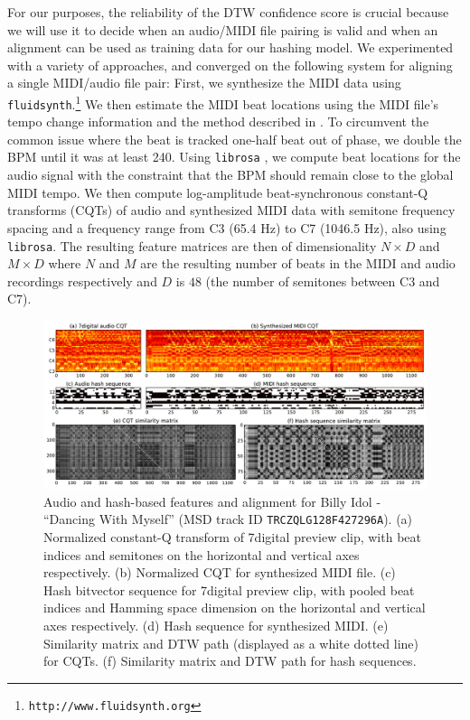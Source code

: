 \documentclass{article}
\begin{document}
For our purposes, the reliability of the DTW confidence score is crucial because we will use it to decide when an audio/MIDI file pairing is valid and when an alignment can be used as training data for our hashing model.
We experimented with a variety of approaches, and converged on the following system for aligning a single MIDI/audio file pair:
First, we synthesize the MIDI data using \texttt{fluidsynth}.\footnote{\texttt{http://www.fluidsynth.org}}
We then estimate the MIDI beat locations using the MIDI file's tempo change information and the method described in \cite{raffel2014pretty_midi}.
To circumvent the common issue where the beat is tracked one-half beat out of phase, we double the BPM until it was at least 240.
Using \texttt{librosa} \cite{mcfee2014librosa}, we compute beat locations for the audio signal with the constraint that the BPM should remain close to the global MIDI tempo. 
We then compute log-amplitude beat-synchronous constant-Q transforms (CQTs) of audio and synthesized MIDI data with semitone frequency spacing and a frequency range from C3 (65.4 Hz) to C7 (1046.5 Hz), also using \texttt{librosa}.
The resulting feature matrices are then of dimensionality $N \times D$ and $M \times D$ where $N$ and $M$ are the resulting number of beats in the MIDI and audio recordings respectively and $D$ is $48$ (the number of semitones between C3 and C7).

\begin{figure}
  \includegraphics[width=\textwidth]{sims_and_dtws.pdf}
  \caption{Audio and hash-based features and alignment for Billy Idol - ``Dancing With Myself'' (MSD track ID \texttt{TRCZQLG128F427296A}).
           (a) Normalized constant-Q transform of 7digital preview clip, with beat indices and semitones on the horizontal and vertical axes respectively.
	   (b) Normalized CQT for synthesized MIDI file.
	   (c) Hash bitvector sequence for 7digital preview clip, with pooled beat indices and Hamming space dimension on the horizontal and vertical axes respectively.
	   (d) Hash sequence for synthesized MIDI.
	   (e) Similarity matrix and DTW path (displayed as a white dotted line) for CQTs.
	   (f) Similarity matrix and DTW path for hash sequences.}
\end{figure}
\end{document}
